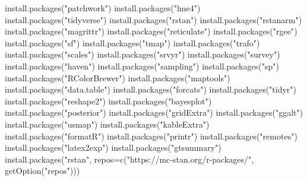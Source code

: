 \documentclass[
  letterpaper,
  DIV=11,
  numbers=noendperiod]{scrartcl}
\newenvironment{Shaded}{\begin{snugshade}}{\end{snugshade}}
\newcommand{\AttributeTok}[1]{\textcolor[rgb]{0.40,0.45,0.13}{#1}}
\newcommand{\FunctionTok}[1]{\textcolor[rgb]{0.28,0.35,0.67}{#1}}
\newcommand{\NormalTok}[1]{\textcolor[rgb]{0.00,0.23,0.31}{#1}}
\newcommand{\StringTok}[1]{\textcolor[rgb]{0.13,0.47,0.30}{#1}}
\begin{document}
\begin{Shaded}
\begin{Highlighting}[]
\FunctionTok{install.packages}\NormalTok{(}\StringTok{"patchwork"}\NormalTok{)}
\FunctionTok{install.packages}\NormalTok{(}\StringTok{"lme4"}\NormalTok{)}
\FunctionTok{install.packages}\NormalTok{(}\StringTok{"tidyverse"}\NormalTok{)}
\FunctionTok{install.packages}\NormalTok{(}\StringTok{"rstan"}\NormalTok{)}
\FunctionTok{install.packages}\NormalTok{(}\StringTok{"rstanarm"}\NormalTok{)}
\FunctionTok{install.packages}\NormalTok{(}\StringTok{"magrittr"}\NormalTok{)}
\FunctionTok{install.packages}\NormalTok{(}\StringTok{"reticulate"}\NormalTok{) }
\FunctionTok{install.packages}\NormalTok{(}\StringTok{"rgee"}\NormalTok{) }
\FunctionTok{install.packages}\NormalTok{(}\StringTok{"sf"}\NormalTok{)}
\FunctionTok{install.packages}\NormalTok{(}\StringTok{"tmap"}\NormalTok{)}
\FunctionTok{install.packages}\NormalTok{(}\StringTok{"trafo"}\NormalTok{)}
\FunctionTok{install.packages}\NormalTok{(}\StringTok{"scales"}\NormalTok{)}
\FunctionTok{install.packages}\NormalTok{(}\StringTok{"srvyr"}\NormalTok{)}
\FunctionTok{install.packages}\NormalTok{(}\StringTok{"survey"}\NormalTok{)}
\FunctionTok{install.packages}\NormalTok{(}\StringTok{"haven"}\NormalTok{)}
\FunctionTok{install.packages}\NormalTok{(}\StringTok{"sampling"}\NormalTok{)}
\FunctionTok{install.packages}\NormalTok{(}\StringTok{"sp"}\NormalTok{)}
\FunctionTok{install.packages}\NormalTok{(}\StringTok{"RColorBrewer"}\NormalTok{)}
\FunctionTok{install.packages}\NormalTok{(}\StringTok{"maptools"}\NormalTok{)}
\FunctionTok{install.packages}\NormalTok{(}\StringTok{"data.table"}\NormalTok{)}
\FunctionTok{install.packages}\NormalTok{(}\StringTok{"forcats"}\NormalTok{)}
\FunctionTok{install.packages}\NormalTok{(}\StringTok{"tidyr"}\NormalTok{)}
\FunctionTok{install.packages}\NormalTok{(}\StringTok{"reshape2"}\NormalTok{)}
\FunctionTok{install.packages}\NormalTok{(}\StringTok{"bayesplot"}\NormalTok{)}
\FunctionTok{install.packages}\NormalTok{(}\StringTok{"posterior"}\NormalTok{)}
\FunctionTok{install.packages}\NormalTok{(}\StringTok{"gridExtra"}\NormalTok{)}
\FunctionTok{install.packages}\NormalTok{(}\StringTok{"ggalt"}\NormalTok{)}
\FunctionTok{install.packages}\NormalTok{(}\StringTok{"usmap"}\NormalTok{)}
\FunctionTok{install.packages}\NormalTok{(}\StringTok{"kableExtra"}\NormalTok{)}
\FunctionTok{install.packages}\NormalTok{(}\StringTok{"formatR"}\NormalTok{)}
\FunctionTok{install.packages}\NormalTok{(}\StringTok{"printr"}\NormalTok{)}
\FunctionTok{install.packages}\NormalTok{(}\StringTok{"remotes"}\NormalTok{)}
\FunctionTok{install.packages}\NormalTok{(}\StringTok{"latex2exp"}\NormalTok{)}
\FunctionTok{install.packages}\NormalTok{(}\StringTok{"gtsummary"}\NormalTok{)}
\FunctionTok{install.packages}\NormalTok{(}\StringTok{"rstan"}\NormalTok{, }\AttributeTok{repos=}\FunctionTok{c}\NormalTok{(}\StringTok{"https://mc{-}stan.org/r{-}packages/"}\NormalTok{, }\FunctionTok{getOption}\NormalTok{(}\StringTok{"repos"}\NormalTok{)))}
\end{Highlighting}
\end{Shaded}
\end{document}
